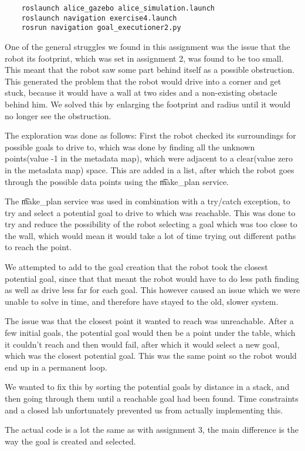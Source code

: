 
\begin{lstlisting}
	roslaunch alice_gazebo alice_simulation.launch	
	roslaunch navigation exercise4.launch
	rosrun navigation goal_executioner2.py
\end{lstlisting}

One of the general struggles we found in this assignment was the issue that the robot its footprint, which was set in assignment 2, was found to be too small. This meant that the robot saw some part behind itself as a possible obstruction. This generated the problem that the robot would drive into a corner and get stuck, because it would have a wall at two sides and a non-existing obstacle behind him. We solved this by enlarging the footprint and radius until it would no longer see the obstruction.

The exploration was done as follows: First the robot checked its surroundings for possible goals to drive to, which was done by finding all the unknown points(value -1 in the metadata map), which were adjacent to a clear(value zero in the metadata map) space. This are added in a list, after which the robot goes through the possible data points using the \t{make_plan} service.

The \t{make_plan} service was used in combination with a try/catch exception, to try and select a potential goal to drive to which was reachable. This was done to try and reduce the possibility of the robot selecting a goal which was too close to the wall, which would mean it would take a lot of time trying out different paths to reach the point.

We attempted to add to the goal creation that the robot took the closest potential goal, since that that meant the robot would have to do less path finding as well as drive less far for each goal. This however caused an issue which we were unable to solve in time, and therefore have stayed to the old, slower system. 

The issue was that the closest point it wanted to reach was unreachable. After a few initial goals, the potential goal would then be a point under the table, which it couldn't reach and then would fail, after which it would select a new goal, which was the closest potential goal. This was the same point so the robot would end up in a permanent loop.

We wanted to fix this by sorting the potential goals by distance in a stack, and then going through them until a reachable goal had been found. Time constraints and a closed lab unfortunately prevented us from actually implementing this.

The actual code is a lot the same as with assignment 3, the main difference is the way the goal is created and selected.






